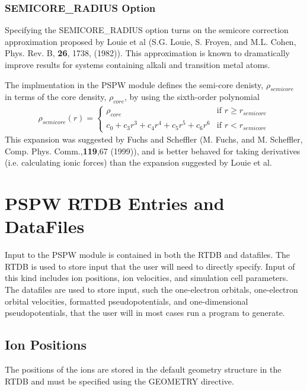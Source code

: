 \subsubsection{SEMICORE\_RADIUS Option}
Specifying the SEMICORE\_RADIUS option turns on the semicore correction approximation proposed
by Louie et al (S.G. Louie, S. Froyen, and M.L. Cohen, Phys. Rev. B, \textbf{26}, 1738, (1982)).  
This approximation is known to dramatically improve results for systems containing 
alkali and transition metal atoms.  

The implmentation in the PSPW module defines the semi-core denisty, $\rho_{semicore}$ in terms of 
the core density, $\rho_{core}$, by using the sixth-order polynomial
\begin{eqnarray}
\rho_{semicore}(r) = \left\{ \begin{array}{ll}
                              \rho_{core} & \mbox{if $r \geq r_{semicore}$} \\
                              c_0 + c_3 r^3 + c_4 r^4 + c_5 r^5 + c_6 r^6 &  \mbox{if $r < r_{semicore}$}
                            \end{array}
                     \right.
\end{eqnarray}
This expansion was suggested by Fuchs and Scheffler 
(M. Fuchs, and M. Scheffler, Comp. Phys. Comm.,\textbf{119},67 (1999)), 
and is better behaved for taking derivatives (i.e. calculating ionic forces) than the expansion suggested 
by Louie et al.


\section{PSPW RTDB Entries and DataFiles}
\label{sec:pspw_data}
Input to the PSPW module is contained in both the RTDB and datafiles.
The RTDB is used to store input that the user will need to directly specify.
Input of this kind includes ion positions, ion velocities, and simulation cell
parameters.  The datafiles are used to store input, such the one-electron 
orbitals, one-electron orbital velocities, formatted pseudopotentials, 
and one-dimensional pseudopotentials, that the user will in most cases
run a program to generate.

\subsection{Ion Positions}
The positions of the ions are stored in the default geometry structure
in the RTDB and must be specified  using the GEOMETRY directive.

